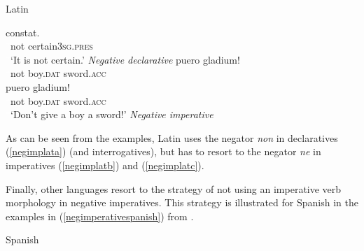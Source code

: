 \begin{exe}
\ex Latin\label{negimplat}
\begin{xlist} 
\ex {} {constat.}\\
{\textcolor{white}{*}not} {certain\textsc{3sg.pres}} \\
\trans \textcolor{white}{*}`It is not certain.' \hfill{\textit{Negative declarative}} \label{negimplata}
\ex {} {puero} {gladium!}\\
{\textcolor{white}{*}not} {boy.\textsc{dat}} {sword.\textsc{acc}} \\
\label{negimplatb}
\ex {} {puero} {gladium!}\\
{\textcolor{white}{*}not} {boy.\textsc{dat}} {sword.\textsc{acc}} \\
\trans \textcolor{white}{*}`Don't give a boy a sword!' \hfill{\textit{Negative imperative}}\label{negimplatc} 

\end{xlist}
\end{exe} 

\noindent As can be seen from the examples, Latin uses the negator \textit{non} in declaratives (\ref{negimplata}) (and interrogatives), but has to resort to the negator \textit{ne} in imperatives (\ref{negimplatb}) and (\ref{negimplatc}). 

Finally, other languages resort to the strategy of not using an imperative verb morphology in negative imperatives. This strategy is illustrated for Spanish in the examples in (\ref{negimperativespanish}) from \citet[57--58]{van2007imperatives}.

\begin{exe}
\ex Spanish \citep[57--58]{van2007imperatives}\label{negimperativespanish}
\begin{xlist}
\end{xlist}
\end{exe}

